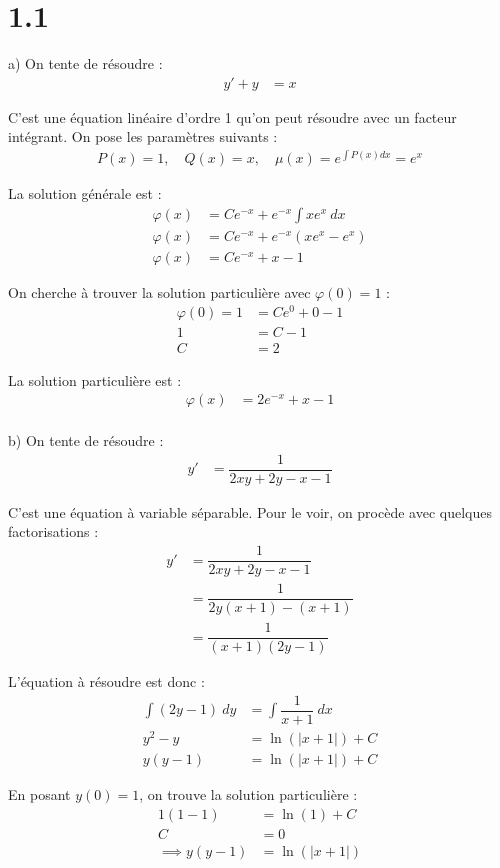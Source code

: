\section*{1.1}

a) On tente de résoudre :
\begin{align*}
    y' + y &= x
\end{align*}

C'est une équation linéaire d'ordre 1 qu'on peut résoudre avec un facteur
intégrant. On pose les paramètres suivants :
\begin{align*}
    P(x) = 1,\quad Q(x) = x,\quad \mu(x) = e^{\int{P(x)dx}} =
    e^{x}
\end{align*}

La solution générale est :
\begin{align*}
    \varphi(x) &= Ce^{-x} + e^{-x}\int{xe^{x}\ dx} \\
    \varphi(x) &= Ce^{-x} + e^{-x}(xe^{x} - e^x) \\
    \varphi(x) &= Ce^{-x} + x - 1
\end{align*}

On cherche à trouver la solution particulière avec $\varphi(0) = 1$ :
\begin{align*}
    \varphi(0) = 1 &= Ce^{0} + 0 - 1 \\
    1 &= C - 1 \\
    C &= 2
\end{align*}

La solution particulière est :
\begin{align*}
    \varphi(x) &= 2e^{-x} + x - 1 \\
\end{align*}


b) On tente de résoudre :
\begin{align*}
    y' &= \dfrac{1}{2xy +2y -x -1}
\end{align*}

C'est une équation à variable séparable. Pour le voir, on procède avec quelques
factorisations :
\begin{align*}
    y' &= \dfrac{1}{2xy +2y -x -1} \\
    &= \dfrac{1}{2y(x + 1) -(x +1)} \\
    &= \dfrac{1}{(x+1)(2y-1)}
\end{align*}

L'équation à résoudre est donc :
\begin{align*}
    \int{(2y-1)\ dy} &= \int{\dfrac{1}{x+1}\ dx} \\
    y^2 -y &= \ln(|x+1|) + C \\
    y(y-1) &= \ln(|x+1|) + C
\end{align*}

En posant $y(0)=1$, on trouve la solution particulière :
\begin{align*}
    1(1-1) &= \ln(1) + C \\
    C &= 0 \\
    \implies 
    y(y-1) &= \ln(|x+1|)
\end{align*}
